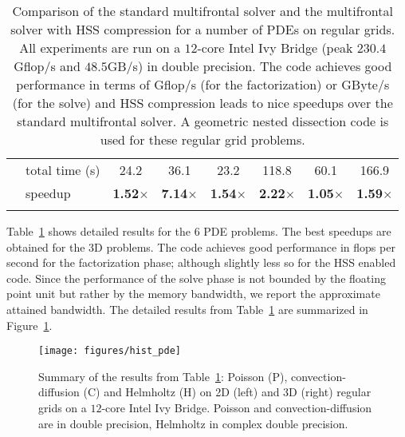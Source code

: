 \documentclass{article}
\newcommand{\tm}{\textsuperscript{\textregistered}}
\begin{document}
\begin{table}[htp!]
\begin{center}
\begin{tabular}{|c|l||c|c|c|c|c|c|}
      \hhline{|~-||-|-|-|-|-|-|}                                                               
      &                         total time (s) &  24.2   &  36.1  &  23.2  &  118.8  & 60.1 & 166.9 \\ 
      \hhline{|~-||-|-|-|-|-|-|}                                                               
&   speedup                              &  \textbf{1.52$\times$}  & \textbf{7.14$\times$}  & \textbf{1.54$\times$} & \textbf{2.22$\times$} & \textbf{1.05$\times$} & \textbf{1.59$\times$}    \\
      \hhline{|--||-|-|-|-|-|-|}
    \end{tabular}
  \end{center}
  \caption{\footnotesize Comparison of the standard multifrontal solver and the multifrontal
    solver with HSS compression for a number of PDEs on regular
    grids. All experiments are run on a $12$-core Intel\tm{} Ivy Bridge (peak
    $230.4$Gflop/s and $48.5$GB/s) in double
    precision. The code achieves good performance in terms of Gflop/s (for the
    factorization) or GByte/s (for the solve) and HSS compression leads to
    nice speedups over the standard multifrontal solver.
    A geometric nested dissection code is used for these regular grid problems.}
  \label{tab:pde_table}
\end{table}
Table~\ref{tab:pde_table} shows detailed results for the 6 PDE
problems. The best speedups are obtained for the 3D problems. The code
achieves good performance in flops per second for the factorization
phase; although slightly less so for the HSS enabled code. Since the
performance of the solve phase is not bounded by the floating point
unit but rather by the memory bandwidth, we report the approximate
attained bandwidth.
The detailed results from Table~\ref{tab:pde_table} are summarized in
Figure~\ref{fig:hist_pde}.
\begin{figure}
  \begin{center}
    \texttt{[image: figures/hist\_pde]}
  \end{center}
  \caption{\footnotesize Summary of the results from
    Table~\ref{tab:pde_table}: Poisson (P), convection-diffusion (C)
    and Helmholtz (H) on 2D (left) and 3D (right) regular grids on a
    $12$-core Intel\tm{} Ivy Bridge. Poisson and convection-diffusion
    are in double precision, Helmholtz in complex double precision.}
  \label{fig:hist_pde}
\end{figure}
\end{document}
